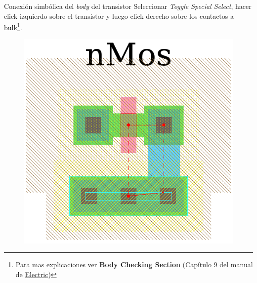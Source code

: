 \documentclass{beamer}
\begin{document}
\begin{frame}{Conexión simbólica del \emph{body} del transistor}
  Seleccionar \emph{Toggle Special Select}, hacer click izquierdo sobre el transistor y luego click derecho sobre los contactos a bulk\footnote{Para mas explicaciones ver \textbf{Body Checking Section} (Capítulo 9 del manual de \href{http://staticfreesoft.com/jmanual/ElectricManual-9.05.pdf}{Electric})}.
\begin{figure}
\includegraphics[width=0.51\linewidth]{figuras/edicionElectric-9b.png}
\end{figure}
\end{frame}
\end{document}
